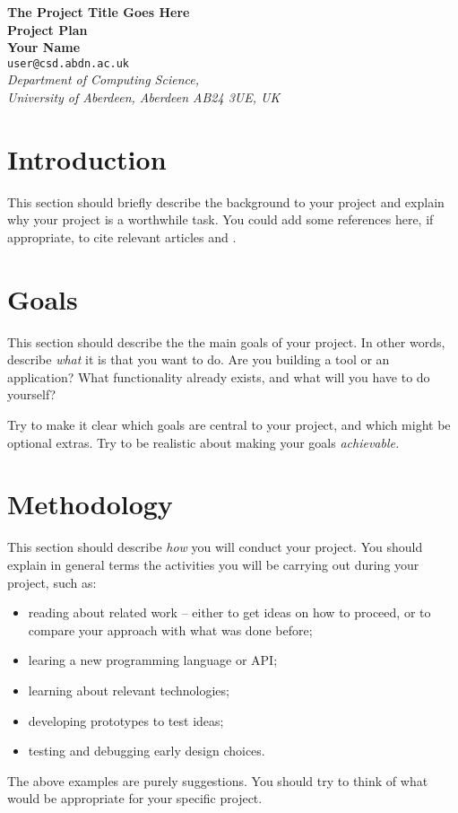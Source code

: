 \documentclass[a4paper,12pt]{article}
\begin{document}
\begin{center}
{\Large\bf{The Project Title Goes Here}} \\
      \vspace{5.0mm}
{\Large\bf{Project Plan}} \\
      \vspace{8mm}
      {\large\bf{Your Name}}  \\
      \vspace{5.0mm}
       {\tt user@csd.abdn.ac.uk} \\
      \vspace{5.0mm}
      {\em Department of Computing Science,\\
       University of Aberdeen, Aberdeen AB24 3UE, UK} 
\end{center}


\section*{Introduction}

This section should briefly describe the background to your
project and explain why your project is a worthwhile task.
You could add some references here, if appropriate, to cite 
relevant articles
\cite{wooldridge2002,shoham95} and \cite{garcia-camino2005}.

\section*{Goals}

This section should describe the the main goals of your project.
In other words, describe {\em what} it is that you want to do.
Are you building a tool or an application? What functionality 
already exists, and what will you have to do yourself?

Try to make it clear which goals are central to your project, and which
might be optional extras. Try to be realistic about making your
goals {\em achievable.}


\section*{Methodology}

This section should describe {\em how} you will conduct
your project. You should explain in general terms
the activities you will be carrying out during your project, such as:
%
\begin{itemize}
\item reading about related work -- either to get ideas on how to
      proceed, or to compare your approach with what was done before;
\item learing a new programming language or API;
\item learning about relevant technologies;
\item developing prototypes to test ideas;
\item testing and debugging early design choices.
\end{itemize}
%
The above examples are purely suggestions. You should try to think
of what would be appropriate for your specific project.
\end{document}
